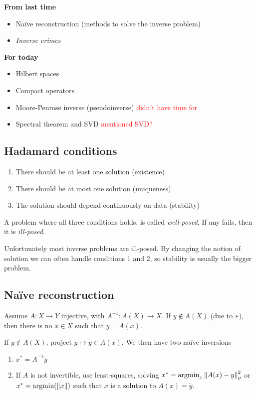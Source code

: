 \documentclass[12pt]{article}
\begin{document}
\textbf{From last time}
\begin{itemize}
    \item Naïve reconstruction (methods to solve the inverse problem)
    \item \textit{Inverse crimes}
\end{itemize}

\textbf{For today}
\begin{itemize}
    \item Hilbert spaces
    \item Compact operators
    \item Moore-Penrose inverse (pseudoinverse) \textcolor{red}{didn't have time for}
    \item Spectral theorem and SVD \textcolor{red}{mentioned SVD?}
\end{itemize}

\subsection{Hadamard conditions}
\begin{enumerate}[label=H\arabic*]
    \item There should be at least one solution (existence)
    \item There should be at most one solution (uniqueness)
    \item The solution should depend continuously on data (stability)
\end{enumerate}
A problem where all three conditions holds, is called \textit{well-posed}. If any fails, then it is \textit{ill-posed}.

Unfortunately most inverse problems are ill-posed. By changing the notion of solution we can often handle conditions 1 and 2, so stability is usually the bigger problem.

\subsection{Naïve reconstruction}
Assume $A:X\to Y$ injective, with  $A^{-1}:A(X)\to X$. If $y\notin A(X)$ (due to $\varepsilon$), then there is no $x\in X$ such that $y=A(x)$. 

If $y\notin A(X)$, project $y\mapsto \tilde{y}\in A(x)$. We then have two naïve inversions
\begin{enumerate}
    \item $x^*=A^{-1}\tilde{y}$
    \item If $A$ is not invertible, use least-squares, solving $x^* = \operatorname{argmin}_x \left\lVert A(x)-y\right\rVert_y^2$ or $x^*= \operatorname{argmin}(\left\lVert x\right\rVert)$ such that $x$ is a solution to $A(x)=\tilde{y}$.
\end{enumerate}
\end{document}
